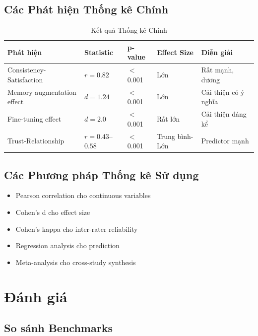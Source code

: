 \documentclass[10pt,leqno]{amsart}
\begin{document}
\subsection{Các Phát hiện Thống kê Chính}

\begin{table}[H]
\centering
\caption{Kết quả Thống kê Chính}
\label{tab:stats}
\begin{tabular}{lllll}
\toprule
\textbf{Phát hiện} & \textbf{Statistic} & \textbf{p-value} & \textbf{Effect Size} & \textbf{Diễn giải} \\
\midrule
Consistency-Satisfaction & $r=0.82$ & $<$0.001 & Lớn & Rất mạnh, dương \\
Memory augmentation effect & $d=1.24$ & $<$0.001 & Lớn & Cải thiện có ý nghĩa \\
Fine-tuning effect & $d=2.0$ & $<$0.001 & Rất lớn & Cải thiện đáng kể \\
Trust-Relationship & $r=0.43$--$0.58$ & $<$0.001 & Trung bình-Lớn & Predictor mạnh \\
\bottomrule
\end{tabular}
\end{table}

\subsection{Các Phương pháp Thống kê Sử dụng}

\begin{itemize}
    \item Pearson correlation cho continuous variables
    \item Cohen's d cho effect size
    \item Cohen's kappa cho inter-rater reliability
    \item Regression analysis cho prediction
    \item Meta-analysis cho cross-study synthesis
\end{itemize}


\section{Đánh giá}

\subsection{So sánh Benchmarks}
\end{document}
